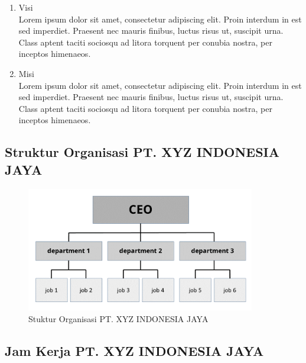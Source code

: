 \begin{enumerate}
    \item Visi \\
          Lorem ipsum dolor sit amet, consectetur adipiscing elit. Proin interdum in est sed imperdiet. Praesent nec mauris finibus, luctus risus ut, suscipit urna. Class aptent taciti sociosqu ad litora torquent per conubia nostra, per inceptos himenaeos.
    \item Misi \\
          Lorem ipsum dolor sit amet, consectetur adipiscing elit. Proin interdum in est sed imperdiet. Praesent nec mauris finibus, luctus risus ut, suscipit urna. Class aptent taciti sociosqu ad litora torquent per conubia nostra, per inceptos himenaeos.
\end{enumerate}

\subsection{Struktur Organisasi PT. XYZ INDONESIA JAYA}

\begin{figure}[H]
    \centering
    \includegraphics[width=10cm]{assets/pics/dummy-organizational-chart.png}
    \caption{Stuktur Organisasi PT. XYZ INDONESIA JAYA}
    \label{fig:organizationalChart}
\end{figure}



\subsection{Jam Kerja PT. XYZ INDONESIA JAYA}

